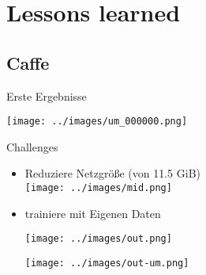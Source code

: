\section{Lessons learned}

\subsection{Caffe}

\begin{frame}{Erste Ergebnisse}

\centering

\texttt{[image: ../images/um\_000000.png]}

\hspace{0.5cm}




\end{frame}

\begin{frame}{Challenges}

\centering

\begin{itemize}
 \item Reduziere Netzgröße (von 11.5 GiB) \\
 \texttt{[image: ../images/mid.png]}
 \item trainiere mit Eigenen Daten \\
 \begin{minipage}{0.45\textwidth}
 \texttt{[image: ../images/out.png]}
 \end{minipage}  \begin{minipage}{0.45\textwidth}
 \texttt{[image: ../images/out-um.png]}  
 \end{minipage}
\end{itemize}
\end{frame}